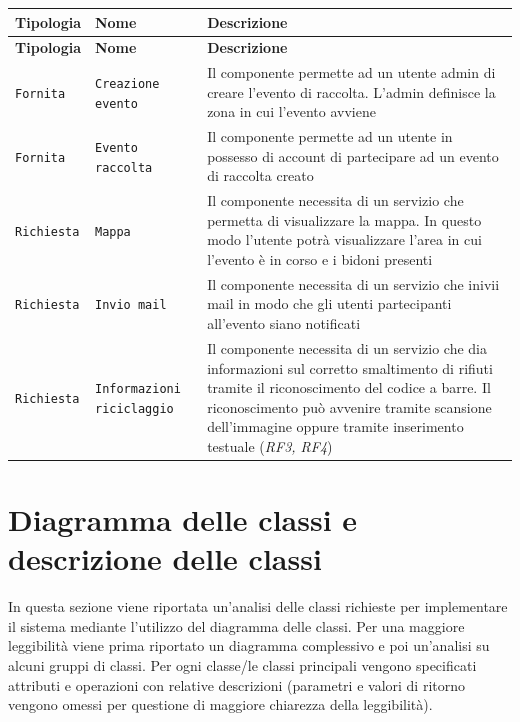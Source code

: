 \documentclass[12pt,a4paper]{article}
\begin{document}
\keepXColumns

\begin{tabularx}{\textwidth}{@{}llX@{}}
\caption{Tabelle descrizione componente per evento raccolta}
\label{tab:placeholder} \\

\toprule
\textbf{Tipologia} & \textbf{Nome} & \textbf{Descrizione} \\
\midrule
\endfirsthead

\toprule
\textbf{Tipologia} & \textbf{Nome} & \textbf{Descrizione} \\
\midrule
\endhead

\bottomrule
\endfoot

\texttt{Fornita} & \texttt{Creazione evento} & Il componente permette ad un utente admin di creare l'evento di raccolta. L'admin definisce la zona in cui l'evento avviene \\ \hline
\texttt{Fornita} & \texttt{Evento raccolta} & Il componente permette ad un utente in possesso di account di partecipare ad un evento di raccolta creato\\ \hline
\texttt{Richiesta} & \texttt{Mappa} & Il componente necessita di un servizio che permetta di visualizzare la mappa. In questo modo l'utente potrà visualizzare l'area in cui l'evento è in corso e i bidoni presenti \\ \hline
\texttt{Richiesta} & \texttt{Invio mail} & Il componente necessita di un servizio che inivii mail in modo che gli utenti partecipanti all'evento siano notificati\\ \hline
\texttt{Richiesta} & \texttt{Informazioni riciclaggio} & Il componente necessita di un servizio che dia informazioni sul corretto smaltimento di rifiuti tramite il riconoscimento del codice a barre. Il riconoscimento può avvenire tramite scansione dell'immagine oppure tramite inserimento testuale (\textit{RF3, RF4})\\

\end{tabularx}

\newpage
\section{Diagramma delle classi e descrizione delle classi} 
In questa sezione viene riportata un'analisi delle classi richieste per implementare il sistema mediante l'utilizzo del diagramma delle classi. 
Per una maggiore leggibilità viene prima riportato un diagramma complessivo e poi un'analisi su alcuni gruppi di classi. 
Per ogni classe/le classi principali vengono specificati attributi e operazioni con relative descrizioni
(parametri e valori di ritorno vengono omessi per questione di maggiore chiarezza della leggibilità).
\end{document}
